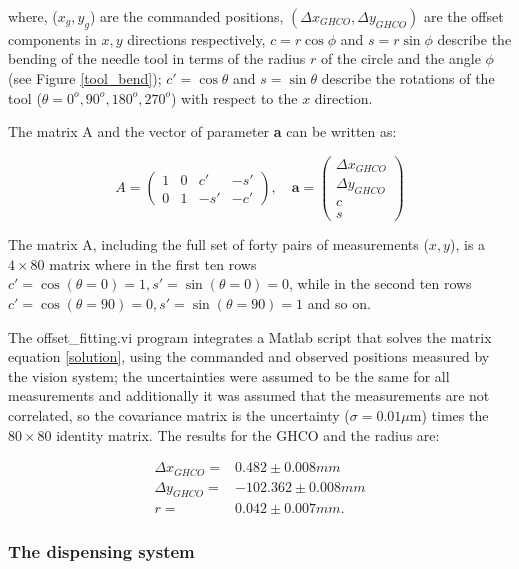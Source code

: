 \noindent where, ($x_g,y_g$) are the commanded positions, $(\Delta x_{GHCO},\Delta y_{GHCO})$ are the offset components in $x,y$ directions respectively, $c=r\cos\phi$ and  $s=r\sin\phi$ describe the bending of the needle tool in terms of the radius $r$ of the circle and the angle $\phi$ (see Figure \ref{tool_bend}); $c'=\cos\theta$ and  $s=\sin\theta$ describe the rotations of the tool ($\theta=0^o, 90^o, 180^o, 270^o$) with respect to the $x$ direction.

The matrix A and the vector of parameter \textbf{a} can be written as:

\begin{equation}
  A=
  \begin{pmatrix}
    1  & 0  & c' & -s' \\
    0  & 1  & -s' & -c' 
  \end{pmatrix}, \quad
  \textbf{a}=
  \begin{pmatrix}
    \Delta x_{GHCO}\\ 
    \Delta y_{GHCO}\\
    c \\
    s 
  \end{pmatrix}
\end{equation}

The matrix A, including the full set of forty pairs of measurements ($x,y$), is a $4\times80$ matrix where in the first ten rows $c'=\cos(\theta=0)=1, s'=\sin(\theta=0)=0$, while in the second ten rows $c'=\cos(\theta=90)=0, s'=\sin(\theta=90)=1$ and so on.   

The offset\_fitting.vi program integrates a Matlab script that solves the matrix equation \ref{solution}, using the commanded and observed positions measured by the vision system; the uncertainties were assumed to be the same for all measurements and additionally it was assumed that the measurements are not correlated, so the covariance matrix is the uncertainty ($\sigma=0.01 \mu$m) times the $80\times80$ identity matrix. The results for the GHCO and the radius are:

\begin{align}
  \Delta x_{GHCO}=& 0.482 \pm 0.008 mm\nonumber\\
  \Delta y_{GHCO}=& -102.362 \pm 0.008 mm\\
  r=&0.042 \pm 0.007 mm\nonumber.
\end{align}

\subsubsection*{The dispensing system}

